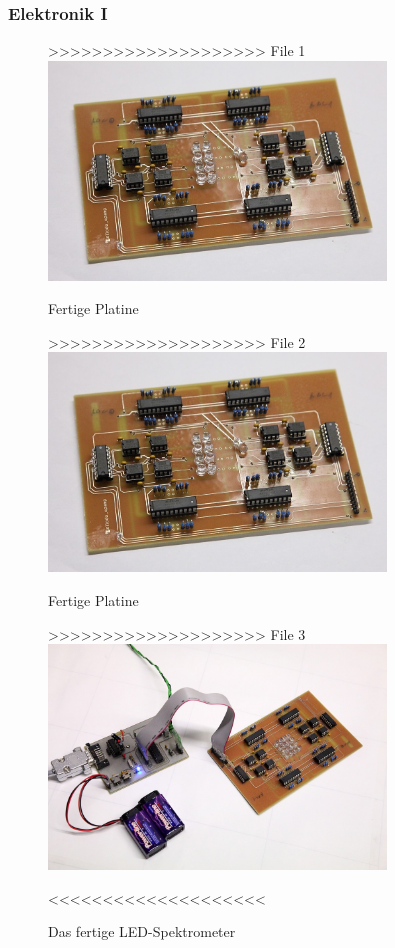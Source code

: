 \documentclass[10pt]{beamer}
\begin{document}
{
\frametitle{Elektronik I}
\begin{figure}
\begin{center}
>>>>>>>>>>>>>>>>>>>> File 1
\includegraphics[width=0.8\textwidth]{./images/prIMG_7253crop.jpg}
\caption{Fertige Platine}
>>>>>>>>>>>>>>>>>>>> File 2
\includegraphics[width=0.8\textwidth]{./images/prIMG_7253crop.jpg}
\caption{Fertige Platine}
>>>>>>>>>>>>>>>>>>>> File 3
\includegraphics[width=0.8\textwidth]{./images/elektronik-final.jpg}
\caption{Das fertige LED-Spektrometer}
<<<<<<<<<<<<<<<<<<<<
\end{center}
\end{figure}
}
\end{document}
